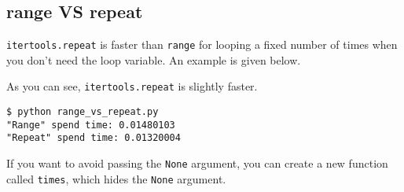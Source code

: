 \subsection{range VS repeat}

\lstinline{itertools.repeat} is faster than \lstinline{range} for looping a fixed number of times when you don't need the loop variable.
An example is given below.



As you can see, \lstinline{itertools.repeat} is slightly faster.

\begin{lstlisting}[caption=Output of range\_vs\_repeat.py]
$ python range_vs_repeat.py
"Range" spend time: 0.01480103
"Repeat" spend time: 0.01320004
\end{lstlisting}

If you want to avoid passing the \lstinline{None} argument, you can create a new function called \lstinline{times}, which hides the \lstinline{None} argument.


